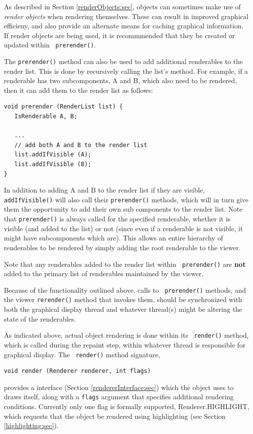 As described in Section \ref{renderObjects:sec}, objects can sometimes
make use of {\it render objects} when rendering themselves. These can
result in improved graphical efficieny, and also provide an alternate
means for caching graphical information. If render objects are being
used, it is recommmended that they be created or updated within {\tt
prerender()}.

The {\tt prerender()} method can also be used to add additional
renderables to the render list. This is done by recursively calling
the list's 
method.
For example, if a
renderable has two subcomponents, A and B, which also need to 
be rendered, then it can add them to the render list as follows:
\begin{lstlisting}[]
void prerender (RenderList list) {
   IsRenderable A, B;

   ... 
   // add both A and B to the render list
   list.addIfVisible (A);
   list.addIfVisible (B);
}
\end{lstlisting}
In addition to adding A and B to the render list if they are visible,
{\tt addIfVisible()} will also call their {\tt prerender()} methods,
which will in turn give them the opportunity to add their own sub
components to the render list. Note that {\tt prerender()} is always
called for the specified renderable, whether it is visible (and added
to the list) or not (since even if a renderable is not visible, it
might have subcomponents which are).  This allows an entire hierarchy
of renderables to be rendered by simply adding the root renderable to
the viewer.

Note that any renderables added to the render list within {\tt
prerender()} are {\bf not} added to the primary list of renderables
maintained by the viewer.

\begin{sideblock}
Because of the functionality outlined above, calls to {\tt
prerender()} methods, and the viewer {\tt rerender()} method that
invokes them, should be synchronized with both the graphical display
thread and whatever thread(s) might be altering the state of the
renderables.
\end{sideblock}

As indicated above, actual object rendering is done within its {\tt
render()} method, which is called during the repaint step, within
whatever thread is responsible for graphical display.  The {\tt
render()} method signature,
%
\begin{lstlisting}[]
void render (Renderer renderer, int flags)
\end{lstlisting}
%
provides a  interface (Section
\ref{rendererInterface:sec}) which the object uses to draws itself,
along with a {\tt flags} argument that specifies additional rendering
conditions.  Currently only one flag is formally supported,
% 
{Renderer.HIGHLIGHT},
which requests that the object be rendered using
highlighting (see Section \ref{highlighting:sec}).

